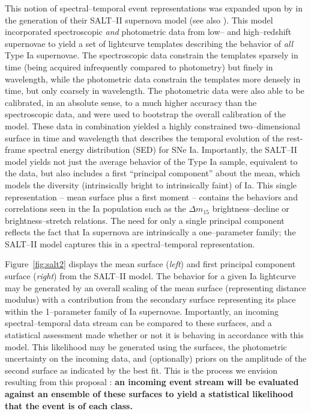 This notion of spectral--temporal event representations was expanded upon  by
\cite{2007A&A...466...11G} in the generation of their SALT--II supernova model
(see also \cite{2007ApJ...663.1187H}).  This model incorporated spectroscopic
{\it and} photometric data from low-- and high--redshift supernovae to yield a
set of lightcurve templates describing the behavior of {\it all} Type Ia
supernovae. The spectroscopic data constrain the templates sparsely in time
(being acquired infrequently compared to photometry) but finely in wavelength,
while the photometric data constrain the templates more densely in time, but
only coarsely in wavelength.  The photometric data were also able to be
calibrated, in an absolute sense, to a much higher accuracy than the
spectroscopic data, and were used to bootstrap the overall calibration of the
model.  These data in combination yielded a highly constrained two--dimensional
surface in time and wavelength that describes the temporal evolution of the
rest-frame spectral energy distribution (SED) for SNe Ia. Importantly, the
SALT--II model yields not just the average behavior of the Type Ia sample,
equivalent to the \cite{2002PASP..114..803N} data, but also includes a first
``principal component'' about the mean, which models the diversity
(intrinsically bright to intrinsically faint) of Ia. This single representation
-- mean surface plus a first moment -- contains the behaviors and correlations
seen in the Ia population such as the $\Delta m_{15}$ brightness--decline
\citep{1993ApJ...413L.105P} or brightness--stretch \citep{1998AJ....116.1009R}
relations.  The need for only a single principal component reflects the fact
that Ia supernova are intrinsically a one--parameter family; the SALT--II model
captures this in a spectral--temporal representation.

Figure~\ref{fig:salt2} displays the mean surface ({\it left}) and first
principal component surface ({\it right}) from the SALT--II model.  The behavior
for a given Ia lightcurve may be generated by an overall scaling of the mean
surface (representing distance modulus) with a contribution from the secondary
surface representing its place within the 1--parameter family of Ia supernovae.
Importantly, an incoming spectral--temporal data stream can be compared to these
surfaces, and a statistical assessment made whether or not it is behaving in
accordance with this model.  This likelihood may be generated using the
surfaces, the photometric uncertainty on the incoming data, and (optionally)
priors on the amplitude of the second surface as indicated by the best fit. This
is the process we envision resulting from this proposal : {\bf an incoming event
stream will be evaluated against an ensemble of these surfaces to yield a
statistical likelihood that the event is of each class.}


